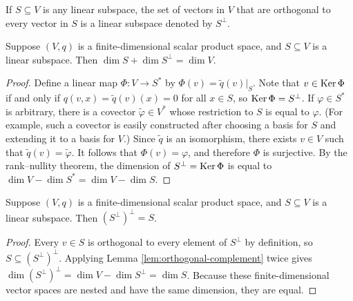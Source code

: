 If $S \subseteq V$ is any linear subspace, the set of vectors in $V$ that are orthogonal to every vector in $S$ is a linear subspace denoted by $S^{\perp}$.

\begin{lemma}
\label{lem:orthogonal-complement}
\leanok
{}
Suppose $(V, q)$ is a finite-dimensional scalar product space, and $S \subseteq V$ is a linear subspace. Then $\dim S + \dim S^{\perp} = \dim V$.
\end{lemma}

\begin{proof}
\leanok
Define a linear map $\Phi : V \to S^*$ by $\Phi(v) = \tilde{q}(v)|_S$. Note that $v \in \operatorname{Ker}\Phi$ if and only if $q(v,x) = \tilde{q}(v)(x) = 0$ for all $x \in S$, so $\operatorname{Ker}\Phi = S^\perp$. If $\varphi \in S^*$ is arbitrary, there is a covector $\tilde{\varphi} \in V^*$ whose restriction to $S$ is equal to $\varphi$. (For example, such a covector is easily constructed after choosing a basis for $S$ and extending it to a basis for $V$.) Since $\tilde{q}$ is an isomorphism, there exists $v \in V$ such that $\tilde{q}(v) = \tilde{\varphi}$. It follows that $\Phi(v) = \varphi$, and therefore $\Phi$ is surjective. By the rank--nullity theorem, the dimension of $S^\perp = \operatorname{Ker}\Phi$ is equal to $\dim V - \dim S^* = \dim V - \dim S$.
\end{proof}

\begin{lemma}
\label{lem:orthogonal-complement-involution}
\leanok
{}
Suppose $(V, q)$ is a finite-dimensional scalar product space, and $S \subseteq V$ is a linear subspace. Then $(S^{\perp})^{\perp} = S$.
\end{lemma}

\begin{proof}
\leanok
{}
Every $v \in S$ is orthogonal to every element of $S^\perp$ by definition, so $S \subseteq (S^\perp)^\perp$. Applying Lemma \ref{lem:orthogonal-complement} twice gives $\dim (S^\perp)^\perp = \dim V - \dim S^\perp = \dim S$. Because these finite-dimensional vector spaces are nested and have the same dimension, they are equal.
\end{proof}

